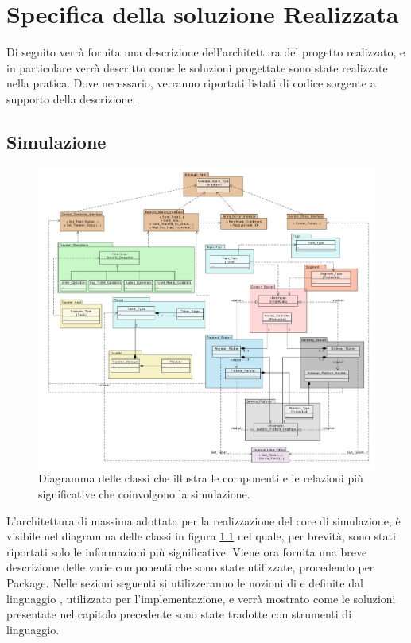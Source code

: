 \newpage
\chapter {Specifica della soluzione Realizzata}

Di seguito verrà fornita una descrizione dell'architettura del progetto realizzato, e in particolare verrà descritto come le soluzioni progettate sono state realizzate nella pratica. Dove necessario, verranno riportati listati di codice sorgente a supporto della descrizione.

\section{Simulazione}

	\begin{figure}[htbp]
		\includegraphics[scale=0.39,trim= 100mm 0mm 0mm 0mm]{imgs/Simplified_Class_Diagram.pdf}
		\caption{\footnotesize{Diagramma delle classi che illustra le componenti e le relazioni più significative che coinvolgono la simulazione.}}
		\label{img:class_diagram}
	\end{figure}

L'architettura di massima adottata per la realizzazione del core di simulazione, è visibile nel diagramma delle classi in figura \ref{img:class_diagram} nel quale, per brevità, sono stati riportati solo le informazioni più significative.
	Viene ora fornita una breve descrizione delle varie componenti che sono state utilizzate, procedendo per Package. Nelle sezioni seguenti si utilizzeranno le nozioni di  e  definite dal linguaggio , utilizzato per l'implementazione, e verrà mostrato come le soluzioni presentate nel capitolo precedente sono state tradotte con strumenti di linguaggio.

